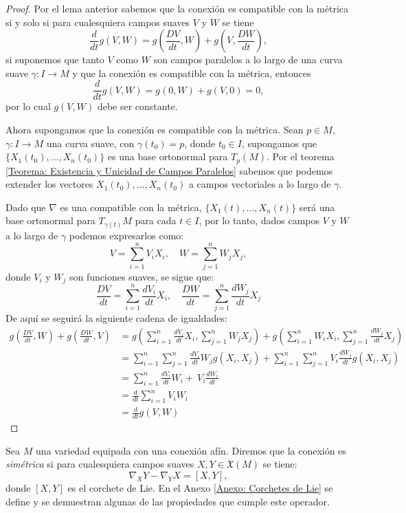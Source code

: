 \begin{proof}
	Por el lema anterior sabemos que la conexión es compatible con la métrica si y solo si para cualesquiera campos suaves $V$ y $W$ se tiene
	\[
		\frac{d}{dt}g(V,W) = g(\frac{DV}{dt},W) + g(V,\frac{DW}{dt}),
	\]
	si suponemos que tanto $V$ como $W$ son campos paralelos a lo largo de una curva suave $\gamma: I \to M$ y que la conexión es compatible con la métrica, entonces
	\[
		\frac{d}{dt}g(V,W) = g(0, W) + g(V, 0) = 0,
	\]
	por lo cual $g(V,W)$ debe ser constante.

	Ahora supongamos que la conexión es compatible con la métrica. Sean $p \in M$, $\gamma: I \to M$ una curva suave, con $\gamma(t_0) = p$, donde $t_{0} \in I$, supongamos que $\{X_{1}(t_{0}), \ldots, X_{n}(t_{0})\}$ es una base ortonormal para $T_{p}(M)$. Por el teorema \ref{Teorema: Existencia y Unicidad de Campos Paralelos} sabemos que podemos extender los vectores $X_{1}(t_0), \ldots, X_{n}(t_{0})$ a campos vectoriales a lo largo de $\gamma$.

	Dado que $\nabla$ es una compatible con la métrica, $\{ X_{1}(t), \ldots, X_{n}(t) \}$ será una base ortonormal para $T_{\gamma(t)}M$ para cada $t \in I$, por lo tanto, dados campos $V$ y $W$ a lo largo de $\gamma$ podemos expresarlos como:
	\[
		V = \sum_{i=1}^{n} V_{i}X_{i}, \quad W = \sum_{j=1}^{n}W_{j}X_{j},
	\]
	donde $V_{i}$ y $W_{j}$ son funciones suaves, se sigue que:
	\[
		\frac{DV}{dt} = \sum_{i=1}^{n} \frac{dV_{i}}{dt} X_{i}, \quad
		\frac{DW}{dt} = \sum_{j=1}^{n} \frac{dW_{j}}{dt} X_{j}
	\]
	De aquí se seguirá la siguiente cadena de igualdades:
	\begin{align*}
		g\left(\frac{DV}{dt},W\right) + g\left(\frac{DW}{dt},V\right)
		 & = g\left(\sum_{i=1}^{n}\frac{dV_i}{dt}X_{i}, \sum_{j=1}^{n}W_j X_j\right)
		+ g\left(\sum_{i=1}^{n}W_i X_i, \sum_{j=1}^{n}\frac{dW_j}{dt}X_{j}\right)    \\
		 & = \sum_{i=1}^{n}\sum_{j=1}^{n} \frac{dV_i}{dt}W_{j}g(X_{i},X_{j})
		+ \sum_{i=1}^{n}\sum_{j=1}^{n} V_{i} \frac{dW_j}{dt}g(X_{i},X_{j})           \\
		 & = \sum_{i=1}^{n} \frac{dV_i}{dt} W_{i} + \ V_{i}\frac{dW_{i}}{dt}         \\
		 & = \frac{d}{dt} \sum_{i=1}^{n} V_{i} W_{i}                                 \\
		 & = \frac{d}{dt} g(V,W)
	\end{align*}
\end{proof}

\begin{definition}
	Sea $M$ una variedad equipada con una conexión afín. Diremos que la conexión es \textit{simétrica} si para cualesquiera campos suaves $X,Y \in \mathfrak{X}(M)$ se tiene:
	\[
		\nabla_{X}Y - \nabla_{Y}X = [X,Y],
	\]
	donde $[X,Y]$ es el corchete de Lie. En el Anexo \ref{Anexo: Corchetes de Lie} se define y se demuestran algunas de las propiedades que cumple este operador.
\end{definition}

